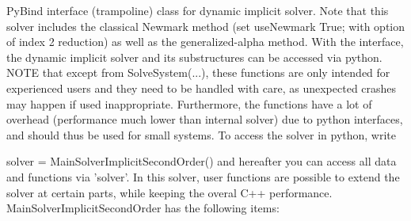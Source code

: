  \label{sec_MainSolverImplicitSecondOrder}
PyBind interface (trampoline) class for dynamic implicit solver. Note that this solver includes the classical Newmark method (set useNewmark True; with option of index 2 reduction) as well as the generalized-alpha method. With the interface, the dynamic implicit solver and its substructures can be accessed via python. NOTE that except from SolveSystem(...), these functions are only intended for experienced users and they need to be handled with care, as unexpected crashes may happen if used inappropriate. Furthermore, the functions have a lot of overhead (performance much lower than internal solver) due to python interfaces, and should thus be used for small systems. To access the solver in python, write \bi
 \item[] solver = MainSolverImplicitSecondOrder() 
\ei
 and hereafter you can access all data and functions via 'solver'.
 In this solver, user functions are possible to extend the solver at certain parts, while keeping the overal C++ performance.\\ 
%
MainSolverImplicitSecondOrder has the following items:
